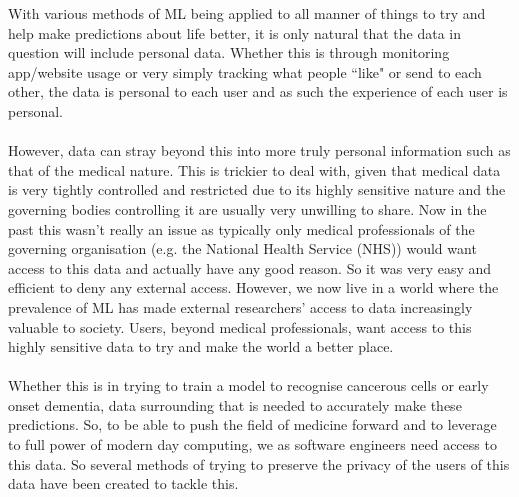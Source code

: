 With various methods of ML being applied to all manner of things to try and help make predictions about life better, it is only natural that the data in question will include personal data. Whether this is through monitoring app/website usage or very simply tracking what people ``like" or send to each other, the data is personal to each user and as such the experience of each user is personal. \\ \\
However, data can stray beyond this into more truly personal information such as that of the medical nature.
This is trickier to deal with, given that medical data is very tightly controlled and restricted due to its highly sensitive nature and the governing bodies controlling it are usually very unwilling to share. 
Now in the past this wasn't really an issue as typically only medical professionals of the governing organisation (e.g. the National Health Service (NHS)) would want access to this data and actually have any good reason. 
So it was very easy and efficient to deny any external access. 
However, we now live in a world where the prevalence of ML has made external researchers' access to data increasingly valuable to society. 
Users, beyond medical professionals, want access to this highly sensitive data to try and make the world a better place.
\\ \\
Whether this is in trying to train a model to recognise cancerous cells or early onset dementia, data surrounding that is needed to accurately make these predictions. 
So, to be able to push the field of medicine forward and to leverage to full power of modern day computing, we as software engineers need access to this data. 
So several methods of trying to preserve the privacy of the users of this data have been created to tackle this.

